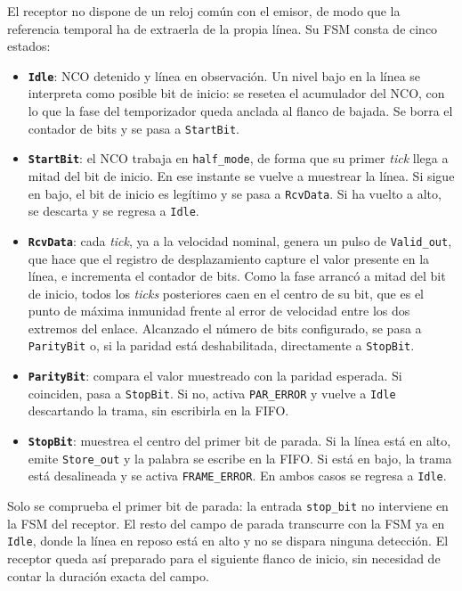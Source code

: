 El receptor no dispone de un reloj común con el emisor, de modo que la referencia temporal ha de
extraerla de la propia línea. Su FSM consta de cinco estados:

\begin{itemize}
    \item \textbf{\texttt{Idle}}: NCO detenido y línea en observación. Un nivel bajo en la línea se
    interpreta como posible bit de inicio: se resetea el acumulador del NCO, con lo que la fase
    del temporizador queda anclada al flanco de bajada. Se borra el contador de bits y se pasa a
    \texttt{StartBit}.

    \item \textbf{\texttt{StartBit}}: el NCO trabaja en \texttt{half\_mode}, de forma que su primer
    \textit{tick} llega a mitad del bit de inicio. En ese instante se vuelve a muestrear la línea.
    Si sigue en bajo, el bit de inicio es legítimo y se pasa a \texttt{RcvData}. Si ha vuelto a
    alto, se descarta y se regresa a \texttt{Idle}.

    \item \textbf{\texttt{RcvData}}: cada \textit{tick}, ya a la velocidad nominal, genera un
    pulso de \texttt{Valid\_out}, que hace que el registro de desplazamiento capture el valor
    presente en la línea, e incrementa el contador de bits. Como la fase arrancó a mitad del bit de
    inicio, todos los \textit{ticks} posteriores caen en el centro de su bit, que es el punto de
    máxima inmunidad frente al error de velocidad entre los dos extremos del enlace. Alcanzado el
    número de bits configurado, se pasa a \texttt{ParityBit} o, si la paridad está deshabilitada,
    directamente a \texttt{StopBit}.

    \item \textbf{\texttt{ParityBit}}: compara el valor muestreado con la paridad esperada. Si
    coinciden, pasa a \texttt{StopBit}. Si no, activa \texttt{PAR\_ERROR} y vuelve a \texttt{Idle}
    descartando la trama, sin escribirla en la FIFO.

    \item \textbf{\texttt{StopBit}}: muestrea el centro del primer bit de parada. Si la línea está
    en alto, emite \texttt{Store\_out} y la palabra se escribe en la FIFO. Si está en bajo, la
    trama está desalineada y se activa \texttt{FRAME\_ERROR}. En ambos casos se regresa a
    \texttt{Idle}.
\end{itemize}

Solo se comprueba el primer bit de parada: la entrada \texttt{stop\_bit} no interviene en la FSM
del receptor. El resto del campo de parada transcurre con la FSM ya en \texttt{Idle}, donde la
línea en reposo está en alto y no se dispara ninguna detección. El receptor queda así preparado
para el siguiente flanco de inicio, sin necesidad de contar la duración exacta del campo.

